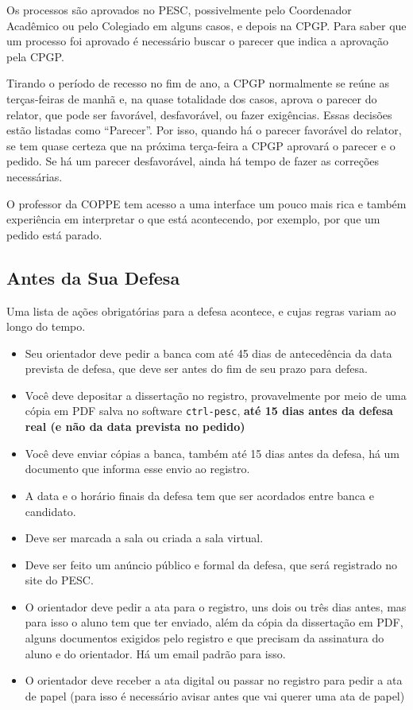 \documentclass[a4paper,12pt]{article}
\begin{document}
Os processos são aprovados no PESC, possivelmente pelo Coordenador Acadêmico ou pelo Colegiado em alguns casos, e depois na CPGP. Para saber que um processo foi aprovado é necessário buscar o parecer que indica a aprovação pela CPGP. 

Tirando o período de recesso no fim de ano, a CPGP normalmente se reúne as terças-feiras de manhã e, na quase totalidade dos casos, aprova o parecer do relator, que pode ser favorável, desfavorável, ou fazer exigências. Essas decisões estão listadas como ``Parecer''. Por isso, quando há o parecer favorável do relator, se tem quase certeza que na próxima terça-feira a CPGP aprovará o parecer e o pedido. Se há um parecer desfavorável, ainda há tempo de fazer as correções necessárias.

O professor da COPPE tem acesso a uma interface um pouco mais rica e também experiência em interpretar o que está acontecendo, por exemplo, por que um pedido está parado.



\subsection{Antes da Sua Defesa}

Uma lista de ações obrigatórias para a defesa acontece, e cujas regras variam ao longo do tempo.

\begin{itemize}
    \item Seu orientador deve pedir a banca com até 45 dias de antecedência da data prevista de defesa, que deve ser antes do fim de seu prazo para defesa. 
    \item Você deve depositar a dissertação no registro, provavelmente por meio de uma cópia em PDF salva no software \verb|ctrl-pesc|, \textbf{até 15 dias antes da defesa real (e não da data prevista no pedido)}
    \item Você deve enviar cópias a banca, também até 15 dias antes da defesa, há um documento que informa esse envio ao registro.
    \item A data e o horário finais da defesa tem que ser acordados entre banca e candidato.
    \item Deve ser marcada a sala ou criada a sala virtual.
    \item Deve ser feito um anúncio público e formal da defesa, que será registrado no site do PESC.
    \item O orientador deve pedir a ata para o registro, uns dois ou três dias antes, mas para isso o aluno tem que ter enviado, além da cópia da dissertação em PDF, alguns documentos exigidos pelo registro e que precisam da assinatura do aluno e do orientador. Há um email padrão para isso.
    \item O orientador deve receber a ata digital ou passar no registro para pedir a ata de papel (para isso é necessário avisar antes que vai querer uma ata de papel)
\end{itemize}
\end{document}
